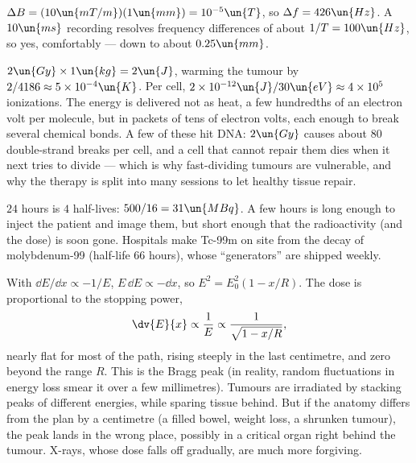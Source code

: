  $\Delta B = (10\un{mT/m})(1\un{mm}) = 10^{-5}\un{T}$, so $\Delta f = 426\un{Hz}$. A $10\un{ms}$ recording resolves frequency differences of about $1/T = 100\un{Hz}$, so yes, comfortably --- down to about $0.25\un{mm}$.

 $2\un{Gy}\times1\un{kg} = 2\un{J}$, warming the tumour by $2/4186\approx5\times10^{-4}\un{K}$. Per cell, $2\times10^{-12}\un{J}/30\un{eV}\approx4\times10^5$ ionizations. The energy is delivered not as heat, a few hundredths of an electron volt per molecule, but in packets of tens of electron volts, each enough to break several chemical bonds. A few of these hit DNA: $2\un{Gy}$ causes about $80$ double-strand breaks per cell, and a cell that cannot repair them dies when it next tries to divide --- which is why fast-dividing tumours are vulnerable, and why the therapy is split into many sessions to let healthy tissue repair.

 $24$ hours is $4$ half-lives: $500/16 = 31\un{MBq}$. A few hours is long enough to inject the patient and image them, but short enough that the radioactivity (and the dose) is soon gone. Hospitals make Tc-99m on site from the decay of molybdenum-99 (half-life $66$ hours), whose ``generators'' are shipped weekly.

 With $\dd E/\dd x\propto-1/E$, $E\,\dd E\propto-\dd x$, so $E^2 = E_0^2(1-x/R)$. The dose is proportional to the stopping power,
\[
  \dv{E}{x}\propto\frac1E\propto\frac{1}{\sqrt{1-x/R}},
\]
nearly flat for most of the path, rising steeply in the last centimetre, and zero beyond the range $R$. This is the Bragg peak (in reality, random fluctuations in energy loss smear it over a few millimetres). Tumours are irradiated by stacking peaks of different energies, while sparing tissue behind. But if the anatomy differs from the plan by a centimetre (a filled bowel, weight loss, a shrunken tumour), the peak lands in the wrong place, possibly in a critical organ right behind the tumour. X-rays, whose dose falls off gradually, are much more forgiving.

